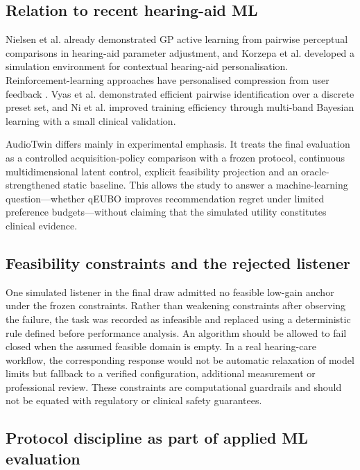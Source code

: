 \documentclass[preprint,12pt]{elsarticle}
\begin{document}
\subsection{Relation to recent hearing-aid ML}

Nielsen et al. \cite{nielsen2015} already demonstrated GP active learning from pairwise perceptual comparisons in hearing-aid parameter adjustment, and Korzepa et al. \cite{korzepa2020} developed a simulation environment for contextual hearing-aid personalisation. Reinforcement-learning approaches have personalised compression from user feedback \cite{alamdari2020,akbarzadeh2022}. Vyas et al. \cite{vyas2022} demonstrated efficient pairwise identification over a discrete preset set, and Ni et al. \cite{ni2024} improved training efficiency through multi-band Bayesian learning with a small clinical validation.

AudioTwin differs mainly in experimental emphasis. It treats the final evaluation as a controlled acquisition-policy comparison with a frozen protocol, continuous multidimensional latent control, explicit feasibility projection and an oracle-strengthened static baseline. This allows the study to answer a machine-learning question---whether qEUBO improves recommendation regret under limited preference budgets---without claiming that the simulated utility constitutes clinical evidence.

\subsection{Feasibility constraints and the rejected listener}

One simulated listener in the final draw admitted no feasible low-gain anchor under the frozen constraints. Rather than weakening constraints after observing the failure, the task was recorded as infeasible and replaced using a deterministic rule defined before performance analysis. An algorithm should be allowed to fail closed when the assumed feasible domain is empty. In a real hearing-care workflow, the corresponding response would not be automatic relaxation of model limits but fallback to a verified configuration, additional measurement or professional review. These constraints are computational guardrails and should not be equated with regulatory or clinical safety guarantees.

\subsection{Protocol discipline as part of applied ML evaluation}
\end{document}

